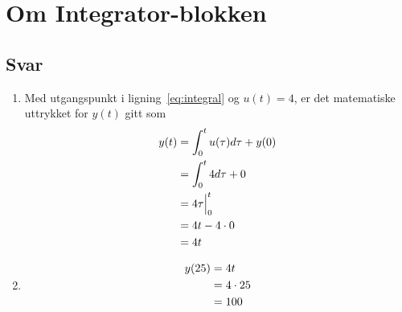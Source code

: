 \documentclass[answers,11pt]{exam}
\begin{document}
\newpage
\section*{Om {\sf  Integrator}-blokken}

\begin{enumerate}[label=\alph*)]

  

  \begin{tcolorbox}
    \subsection*{Svar}

    \begin{enumerate}[label=a\arabic*)]
      \item  Med utgangspunkt i ligning~\eqref{eq:integral}  og
            $u(t){=}4$, er det matematiske uttrykket for $y(t)$ gitt som
            \begin{align}
              y(t) & = \int_{0}^{t} u(\tau) d\tau + y(0) \notag \\
                   & = \int_{0}^{t}4d\tau +0 \notag             \\
                   & = 4 \tau \Big|_0^t \notag                  \\
                   & = 4t - 4 \cdot 0 \notag                    \\
                   & = 4t
            \end{align}

      \item
            \begin{align}
              y(25) & = 4t \notag         \\
                    & = 4 \cdot 25 \notag \\
                    & = 100
            \end{align}


\end{enumerate}
\end{tcolorbox}
\end{enumerate}
\end{document}
